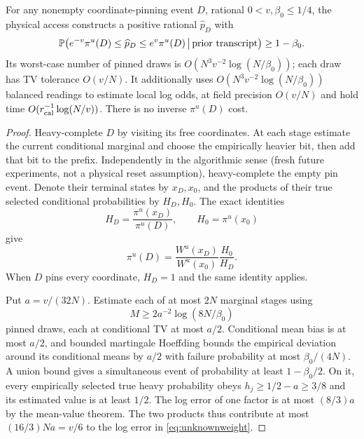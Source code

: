 \begin{lemma}\label{lem:pinmass}
For any nonempty coordinate-pinning event $D$, rational
$0<v,\beta_0\le1/4$, the physical access constructs a positive rational
$\widehat p_D$ with
\[
 \mathbb P\!\left(e^{-v}\pi^u(D)\le\widehat p_D\le e^v\pi^u(D)
       \,\middle|\,\hbox{prior transcript}\right)\ge1-\beta_0 .
\]
Its worst-case number of pinned draws is
$O(N^3v^{-2}\log(N/\beta_0))$; each draw has TV tolerance $O(v/N)$.
It additionally uses $O(N^3v^{-2}\log(N/\beta_0))$ balanced readings to
estimate local log odds, at field precision $O(v/N)$ and hold time
$O(r_{\rm cal}^{-1}\log(N/v))$. There is no inverse $\pi^u(D)$ cost.
\end{lemma}
\begin{proof}
Heavy-complete $D$ by visiting its free coordinates. At each stage estimate
the current conditional marginal and choose the empirically heavier bit,
then add that bit to the prefix. Independently in the algorithmic sense
(fresh future experiments, not a physical reset assumption), heavy-complete
the empty pin event. Denote their terminal states by $x_D,x_0$, and the
products of their true selected conditional probabilities by $H_D,H_0$.
The exact identities
\[
 H_D=\frac{\pi^u(x_D)}{\pi^u(D)},\qquad H_0=\pi^u(x_0)
\]
give
\begin{equation}\label{eq:unknownweight}
 \pi^u(D)=
   \frac{W^u(x_D)}{W^u(x_0)}\frac{H_0}{H_D}.
\end{equation}
When $D$ pins every coordinate, $H_D=1$ and the same identity applies.

Put $a=v/(32N)$. Estimate each of at most $2N$ marginal stages using
\[
 M\ge 2a^{-2}\log(8N/\beta_0)
\]
pinned draws, each at conditional TV at most $a/2$. Conditional mean bias
is at most $a/2$, and bounded martingale Hoeffding bounds the empirical
deviation around its conditional means by $a/2$ with failure probability
at most $\beta_0/(4N)$. A union bound gives a simultaneous event of
probability at least $1-\beta_0/2$.
On it, every empirically selected true heavy probability obeys
$h_j\ge1/2-a\ge3/8$ and its estimated value is at least $1/2$.
The log error of one factor is at most $(8/3)a$ by the mean-value theorem.
The two products thus contribute at most $(16/3)Na=v/6$ to the log error
in \eqref{eq:unknownweight}.


\end{proof}
